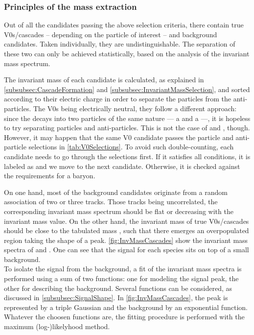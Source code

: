 \subsubsection{Principles of the mass extraction}
\label{subsubsec:PrinciplesOfMassExtraction}

Out of all the candidates passing the above selection criteria, there contain true V0s/cascades -- depending on the particle of interest -- and background candidates. Taken individually, they are undistinguishable. The separation of these two can only be achieved statistically, based on the analysis of the invariant mass spectrum.

The invariant mass of each candidate is calculated, as explained in \Sec\ref{subsubsec:CascadeFormation} and \Sec\ref{subsubsec:InvariantMassSelection}, and sorted according to their electric charge in order to separate the particles from the anti-particles. The V0s being electrically neutral, they follow a different approach: since the \rmKzeroS decays into two particles of the same nature --- a \rmPiPlus and a \rmPiMinus ---, it is hopeless to try separating particles and anti-particles. This is not the case of \rmLambda and \rmAlambda, though. However, it may happen that the same V0 candidate passes the particle and anti-particle selections in \tab\ref{tab:V0Selections}. To avoid such double-counting, each candidate needs to go through the \rmLambda selections first. If it satisfies all conditions, it is labeled as \rmLambda and we move to the next candidate. Otherwise, it is checked against the requirements for a \rmAlambda baryon.

On one hand, most of the background candidates originate from a random association of two or three tracks. Those tracks being uncorrelated, the corresponding invariant mass spectrum should be flat or decreasing with the invariant mass value. On the other hand, the invariant mass of true V0s/cascades should be close to the tabulated mass \mPDG, such that there emerges an overpopulated region taking the shape of a peak. \Figs\ref{fig:InvMassCascades} show the invariant mass spectra of \rmXi and \rmOmega.  One can see that the signal for each species sits on top of a small background.\\

To isolate the signal from the background, a fit of the invariant mass spectra is performed using a sum of two functions: one for modeling the signal peak, the other for describing the background. Several functions can be considered, as discussed in \Sec\ref{subsubsec:SignalShape}. In \figs\ref{fig:InvMassCascades}, the peak is represented by a triple Gaussian \cite{atlascollaborationKs02012} and the background by an exponential function. Whatever the choosen functions are, the fitting procedure is performed with the maximum (log-)likelyhood method.


